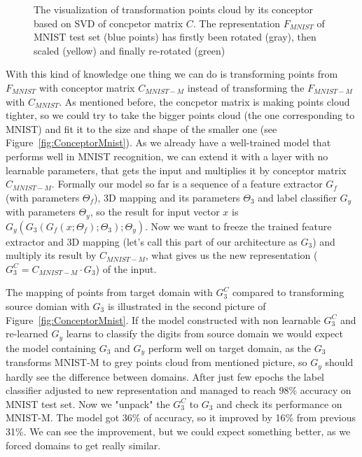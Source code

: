\documentclass{article}
\begin{document}
\begin{figure}[htb]%
    \centering
    \qquad
    \qquad
    \qquad
    \caption{The visualization of transformation points cloud by its conceptor based on SVD of concpetor matrix $C$. The representation $F_{MNIST}$ of MNIST test set (blue points) has firstly been rotated (gray), then scaled (yellow) and finally re-rotated (green)}%
    \label{fig:ConceptorRotation}%
\end{figure}
\par
With this kind of knowledge one thing we can do is transforming points from $F_{MNIST}$ with conceptor matrix $C_{MNIST-M}$ instead of transforming the $F_{MNIST-M}$ with $C_{MNIST}$. As mentioned before, the concpetor matrix is making points cloud tighter, so we could try to take the bigger points cloud (the one corresponding to MNIST) and fit it to the size and shape of the smaller one (see Figure~\ref{fig:ConceptorMnist}). As we already have a well-trained model that performs well in MNIST recognition, we can extend it with a layer with no learnable parameters, that gets the input and multiplies it by conceptor matrix $C_{MNIST-M}$. Formally our model so far is a sequence of a feature extractor $G_{f}$ (with parameters $\Theta_{f}$), 3D mapping and its parameters $\Theta_{3}$ and label classifier $G_{y}$ with parameters $\Theta_{y}$, so the result for input vector $x$ is $G_{y}( G_{3}( G_{f}( x ; \Theta_{f}) ; \Theta_{3} ) ; \Theta_{y} )$. Now we want to freeze the trained feature extractor and 3D mapping (let's call this part of our architecture as $G_{3}$) and multiply its result by $C_{MNIST-M}$, what gives us the new representation ($G_{3} ^ {C} = C_{MNIST-M} \cdot G_{3}$) of the input.
\par
The mapping of points from target domain with $G_{3}^{C}$ compared to transforming source domian with $G_{3}$ is illustrated in the second picture of Figure~\ref{fig:ConceptorMnist}. If the model constructed with non learnable $G_{3}^{C}$ and re-learned $G_{y}$ learns to classify the digits from source domain we would expect the model containing $G_{3}$ and $G_{y}$ perform well on target domain, as the $G_{3}$ transforms MNIST-M to grey points cloud from mentioned picture, so $G_{y}$ should hardly see the difference between domains. After just few epochs the label classifier adjusted to new representation and managed to reach 98\% accuracy on MNIST test set. Now we "unpack" the $G_{3}^{C}$ to $G_{3}$ and check its performance on MNIST-M. The model got 36\% of accuracy, so it improved by 16\% from previous 31\%. We can see the improvement, but we could expect something better, as we forced domains to get really similar.
\end{document}
